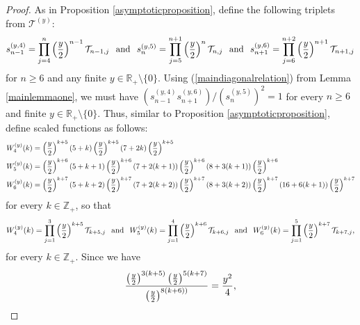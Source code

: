 \documentclass[a4paper,12pt]{article}
\def\R{\mathbb{R}}
\def\Z{\mathbb{Z}}
\def\T{\mathcal{T}}
\begin{document}
\begin{proof}
As in Proposition \ref{asymptoticproposition}, define the following triplets from $\T^{(y)}$:
\begin{align}
s^{(y,4)}_{n-1} = \prod_{j=4}^{n} \left(\frac{y}{2} \right)^{n-1}\T_{n-1,j} \hspace{0.1in} \text{and} \hspace{0.1in} s^{(y,5)}_{n} = \prod_{j=5}^{n+1} \left(\frac{y}{2} \right)^n\T_{n,j} \hspace{0.1in} \text{and} \hspace{0.1in} s^{(y,6)}_{n+1} = \prod_{j=6}^{n+2} \left(\frac{y}{2} \right)^{n+1}\T_{n+1,j}\notag
\end{align}
for $n\geq 6$ and any finite $y\in\R_+\setminus\{0\}$. Using (\ref{maindiagonalrelation}) from Lemma \ref{mainlemmaone}, we must have $(s^{(y,4)}_{n-1}s^{(y,6)}_{n+1})/(s^{(y,5)}_n)^2 = 1$ for every $n\geq 6$ and finite $y\in\R_+\setminus\{0\}$. Thus, similar to Proposition \ref{asymptoticproposition}, define scaled functions as follows:
\begin{align}
&W^{(y)}_4(k) = \left(\frac{y}{2} \right)^{k+5}(5+k)\left(\frac{y}{2} \right)^{k+5}(7+2k)\left(\frac{y}{2} \right)^{k+5}  \notag \\
&W^{(y)}_5(k) = \left(\frac{y}{2} \right)^{k+6}(5+k+1)\left(\frac{y}{2} \right)^{k+6}(7+2(k+1))\left(\frac{y}{2} \right)^{k+6}(8+3(k+1))\left(\frac{y}{2} \right)^{k+6}\notag \\
&W^{(y)}_6(k) = \left(\frac{y}{2} \right)^{k+7}(5+k+2)\left(\frac{y}{2} \right)^{k+7}(7+2(k+2))\left(\frac{y}{2} \right)^{k+7}(8+3(k+2))\left(\frac{y}{2} \right)^{k+7}(16+6(k+1))\left(\frac{y}{2} \right)^{k+7} \notag
\end{align}
for every $k\in\Z_+$, so that
\begin{align}
W^{(y)}_4(k) = \prod_{j=1}^{3} \left(\frac{y}{2} \right)^{k+5}\T_{k+5,j} \hspace{0.1in} \text{and} \hspace{0.1in} W^{(y)}_5(k) = \prod_{j=1}^{4} \left(\frac{y}{2} \right)^{k+6}\T_{k+6,j} \hspace{0.1in} \text{and} \hspace{0.1in} W^{(y)}_6(k) = \prod_{j=1}^{5} \left(\frac{y}{2} \right)^{k+7}\T_{k+7,j}, \notag
\end{align}
for every $k\in\Z_+$. Since we have
\begin{align}
\frac{\left(\frac{y}{2}\right)^{3(k+5)}\left(\frac{y}{2}\right)^{5(k+7)}}{\left(\frac{y}{2}\right)^{8(k+6))}} = \frac{y^2}{4}, \notag

\end{align}
\end{proof}
\end{document}

